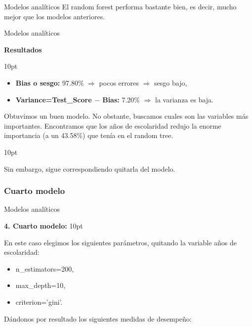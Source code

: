 \documentclass[pdf]{beamer}
\def\vspace{}%
\begin{document}
{\begin{frame}{Modelos analíticos}
    El random forest performa bastante bien, es decir, mucho mejor que los modelos anteriores.

\end{frame}

\begin{frame}{Modelos analíticos}

    \begin{Large}
        \textbf{Resultados}
    \end{Large}
    \vspace{10pt}    
    
    \begin{itemize}
        \item \textbf{Bias o sesgo:} 97.80\% $\Rightarrow$ pocos errores $\Rightarrow$ sesgo bajo,
        \item \textbf{Variance=Test\_Score $-$ Bias:} 7.20\% $\Rightarrow$ la varianza es baja.
    \end{itemize}
    
    Obtuvimos un buen modelo. No obstante, buscamos cuales son las variables más importantes. Encontramos que los años de escolaridad redujo la enorme importancia (a un 43.58\%) que tenía en el random tree. 
    
    \vspace{10pt}
    
    Sin embargo, sigue correspondiendo quitarla del modelo.

\end{frame}

\subsubsection{Cuarto modelo}

\begin{frame}{Modelos analíticos}

    \textbf{4. Cuarto modelo:}
    \vspace{10pt}

    En este caso elegimos los siguientes parámetros, quitando la variable años de escolaridad:
    \begin{itemize}
        \item n\_estimators=200,
        \item max\_depth=10,
        \item criterion='gini'.
    \end{itemize}
    
    Dándonos por resultado los siguientes medidas de desempeño:
    

\end{frame}}
\end{document}
